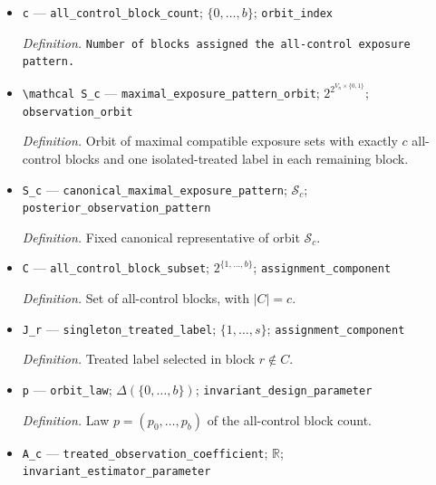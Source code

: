 \documentclass{article}
\begin{document}
\begin{itemize}
  \par\smallskip\noindent\emph{Definition.} DTE exposure-level conflict graph induced by \(G_{b,s}\).
  \item \texttt{c} --- \texttt{all\_\allowbreak{}control\_\allowbreak{}block\_\allowbreak{}count}; \(\{0,\ldots,b\}\); \texttt{orbit\_\allowbreak{}index}
  \par\smallskip\noindent\emph{Definition.} \texttt{Number of blocks assigned the all-\allowbreak{}control exposure pattern.}
  \item \texttt{\textbackslash{}\allowbreak{}mathcal S\_\allowbreak{}c} --- \texttt{maximal\_\allowbreak{}exposure\_\allowbreak{}pattern\_\allowbreak{}orbit}; \(2^{2^{V_n\times\{0,1\}}}\); \texttt{observation\_\allowbreak{}orbit}
  \par\smallskip\noindent\emph{Definition.} Orbit of maximal compatible exposure sets with exactly \(c\) all-control blocks and one isolated-treated label in each remaining block.
  \item \texttt{S\_\allowbreak{}c} --- \texttt{canonical\_\allowbreak{}maximal\_\allowbreak{}exposure\_\allowbreak{}pattern}; \(\mathcal S_c\); \texttt{posterior\_\allowbreak{}observation\_\allowbreak{}pattern}
  \par\smallskip\noindent\emph{Definition.} Fixed canonical representative of orbit \(\mathcal S_c\).
  \item \texttt{C} --- \texttt{all\_\allowbreak{}control\_\allowbreak{}block\_\allowbreak{}subset}; \(2^{\{1,\ldots,b\}}\); \texttt{assignment\_\allowbreak{}component}
  \par\smallskip\noindent\emph{Definition.} Set of all-control blocks, with \(|C|=c\).
  \item \texttt{J\_\allowbreak{}r} --- \texttt{singleton\_\allowbreak{}treated\_\allowbreak{}label}; \(\{1,\ldots,s\}\); \texttt{assignment\_\allowbreak{}component}
  \par\smallskip\noindent\emph{Definition.} Treated label selected in block \(r\notin C\).
  \item \texttt{p} --- \texttt{orbit\_\allowbreak{}law}; \(\Delta(\{0,\ldots,b\})\); \texttt{invariant\_\allowbreak{}design\_\allowbreak{}parameter}
  \par\smallskip\noindent\emph{Definition.} Law \(p=(p_0,\ldots,p_b)\) of the all-control block count.
  \item \texttt{A\_\allowbreak{}c} --- \texttt{treated\_\allowbreak{}observation\_\allowbreak{}coefficient}; \(\mathbb R\); \texttt{invariant\_\allowbreak{}estimator\_\allowbreak{}parameter}

\end{itemize}
\end{document}
